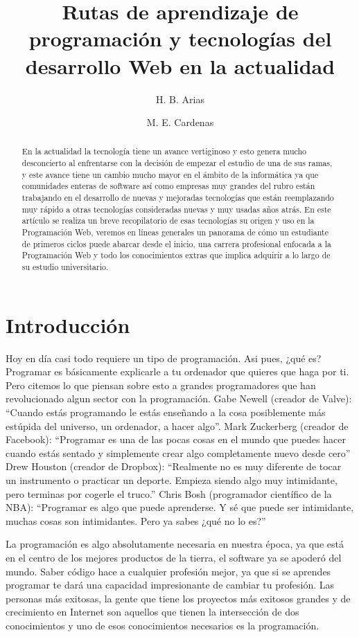 \documentclass[a4paper, twocolumns]{IEEEtran}
\title{Rutas de aprendizaje de programación y tecnologías del desarrollo Web en la actualidad}
\author[1]{H. B. Arias}
\author[2]{M. E. Cardenas}
\affil[1]{Facultad de Estudios Generales, Universidad Nacional Mayor de San Marcos}
\affil[2]{Introducción a las Ciencias e Ingeniería}
\begin{document}
\maketitle %
\begin{abstract}
   En la actualidad la tecnología tiene un avance vertiginoso y esto genera
   mucho desconcierto al enfrentarse con la decisión de empezar el estudio de
   una de sus ramas, y este avance tiene un cambio mucho mayor en el ámbito de
   la informática ya que comunidades enteras de software así como empresas muy
   grandes del rubro están trabajando en el desarrollo de nuevas y mejoradas
   tecnologías que están reemplazando muy rápido a otras tecnologías
   consideradas nuevas y muy usadas años atrás. En este artículo se realiza un
   breve recopilatorio de esas tecnologías su origen y uso en la Programación
   Web, veremos en líneas generales un panorama de cómo un estudiante de
   primeros ciclos puede abarcar desde el inicio, una carrera profesional
   enfocada a la Programación Web y todo los conocimientos extras que implica
   adquirir a lo largo de su estudio universitario.
\end{abstract}
\section{Introducción}
Hoy en día casi todo requiere un tipo de programación. Asi pues, ¿qué es?
Programar es básicamente explicarle a tu ordenador que quieres que haga por ti.
Pero citemos lo que piensan sobre esto a grandes programadores que han
revolucionado algun sector con la programación.  Gabe Newell (creador de
Valve): ``Cuando estás programando le estás enseñando a la cosa posiblemente más
estúpida del universo, un ordenador, a hacer algo''.  Mark Zuckerberg (creador
de Facebook): ``Programar es una de las pocas cosas en el mundo que puedes hacer
cuando estás sentado y simplemente crear algo completamente nuevo desde cero''
Drew Houston (creador de Dropbox): ``Realmente no es muy diferente de tocar un
instrumento o practicar un deporte. Empieza siendo algo muy intimidante, pero
terminas por cogerle el truco.'' Chris Bosh (programador científico de la NBA):
``Programar es algo que puede aprenderse. Y sé que puede ser intimidante,
muchas cosas son intimidantes. Pero ya sabes ¿qué no lo es?''

La programación es algo absolutamente necesaria en nuestra época, ya que está
en el centro de los mejores productos de la tierra, el software ya se apoderó
del mundo. Saber código hace a cualquier profesión mejor, ya que si se aprendes
programar te dará una capacidad impresionante de cambiar tu profesión. Las
personas más exitosas, la gente que tiene los proyectos más exitosos grandes y
de crecimiento en Internet son aquellos que tienen la intersección de dos
conocimientos y uno de esos conocimientos necesarios es la programación.
\end{document}
